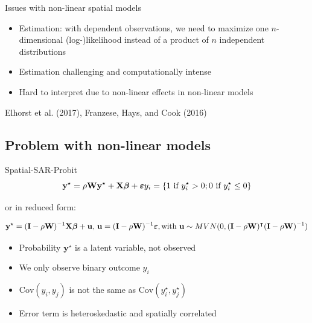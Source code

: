 \documentclass[
  letterpaper,
]{scrbook}
\begin{document}
Issues with non-linear spatial models

\begin{itemize}
\item
  Estimation: with dependent observations, we need to maximize one
  \(n\)-dimensional (log-)likelihood instead of a product of \(n\)
  independent distributions
\item
  Estimation challenging and computationally intense
\item
  Hard to interpret due to non-linear effects in non-linear models
\end{itemize}

Elhorst et al. (2017), Franzese, Hays, and Cook (2016)

\hypertarget{problem-with-non-linear-models}{%
\subsection{Problem with non-linear
models}\label{problem-with-non-linear-models}}

Spatial-SAR-Probit \[
        {\boldsymbol{\mathbf{y}}^\star}=\rho{\boldsymbol{\mathbf{W}}}{\boldsymbol{\mathbf{y}}^\star}+{\boldsymbol{\mathbf{X}}}{\boldsymbol{\mathbf{\beta}}}+ {\boldsymbol{\mathbf{\varepsilon}}} \\     
        y_i = \{1 \text{ if } y_i^\star > 0; 0 \text{ if } y_i^\star \leq 0 \} \nonumber
\]

or in reduced form:

\[
        {\boldsymbol{\mathbf{y}}^\star}=(\boldsymbol{\mathbf{I}} - \rho{\boldsymbol{\mathbf{W}}})^{-1}{\boldsymbol{\mathbf{X}}}{\boldsymbol{\mathbf{\beta}}} + \boldsymbol{\mathbf{u}} \text{, } \boldsymbol{\mathbf{u}} = (\boldsymbol{\mathbf{I}} - \rho{\boldsymbol{\mathbf{W}}})^{-1}{\boldsymbol{\mathbf{\varepsilon}}},\\
        \text{with } \boldsymbol{\mathbf{u}} \sim MVN(0, (\boldsymbol{\mathbf{I}} - \rho{\boldsymbol{\mathbf{W}}})^\intercal (\boldsymbol{\mathbf{I}} - \rho{\boldsymbol{\mathbf{W}}})^{-1}) \nonumber
\]

\begin{itemize}
\item
  Probability \(\boldsymbol{\mathbf{y}}^\star\) is a latent variable,
  not observed
\item
  We only observe binary outcome \(y_i\)
\item
  \(\mathrm{Cov}(y_i, y_j)\) is not the same as
  \(\mathrm{Cov}(y_i^\star, y_j^\star)\)
\item
  Error term is heteroskedastic and spatially correlated
\end{itemize}
\end{document}

